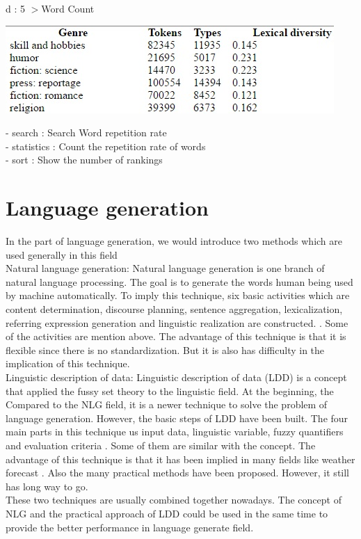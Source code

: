 d : 5 $>$Word Count

\begin{center}
	\includegraphics[width=\columnwidth]{union_02.jpg}
\end{center}
- search       \hspace{0.3cm} : Search Word repetition rate \\
- statistics   : Count the repetition rate of words \\
- sort         \hspace{0.8cm}: Show the number of rankings \\




\section*{Language generation}
\label{sec:prob}
In the part of language generation, we would introduce two methods which are used generally in this field  \\
Natural language generation: Natural language generation is one branch of natural language processing. The goal is to generate the words human being used by machine automatically. To imply this technique, six basic activities which are content determination, discourse planning, sentence aggregation, lexicalization, referring expression generation and linguistic realization are constructed. \cite{aramossoto2016onthe}. Some of the activities are mention above. The advantage of this technique is that it is flexible since there is no standardization. But it is also has difficulty in the implication of this technique.\\
Linguistic description of data: Linguistic description of data (LDD) is a concept that applied the fussy set theory to the linguistic field. At the beginning, the Compared to the NLG field, it is a newer technique to solve the problem of language generation. However, the basic steps of LDD have been built. The four main parts in this technique us input data, linguistic variable, fuzzy quantifiers and evaluation criteria \cite{aramossoto2016onthe}. Some of them are similar with the concept. The advantage of this technique is that it has been implied in many fields like weather forecast \cite{Ramos-SotoBBT14}. Also the many practical methods have been proposed. However, it still has long way to go.\\
These two techniques are usually combined together nowadays. The concept of NLG and the practical approach of LDD could be used in the same time to provide the better performance in language generate field.


